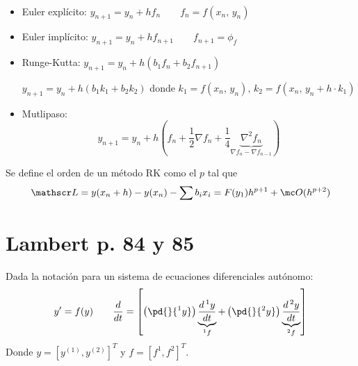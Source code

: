 \begin{ejems} \, 
    \begin{itemize}
        \item Euler expl\'icito: $y_{n+1} = y_n + h f_n \qquad f_n = f(x_n,\, y_n)$
        \item Euler impl\'icito: $y_{n+1} = y_n + h f_{n+1} \qquad f_{n+1} = \phi_f $
        \item Runge-Kutta: $y_{n+1} = y_n + h(b_1 f_n + b_2 f_{n+1}) $
        
        \hspace{1.5cm} $y_{n+1} = y_n + h(b_1 k_1 + b_2 k_2) $ donde $k_1 = f(x_n,\, y_n), \, k_2 = f(x_n,\, y_n+h \cdot k_1)$
        \item Mutlipaso: 
        $$y_{n+1} = y_n + h \left( f_n + \frac{1}{2} \nabla f_n  + \frac{1}{4} \underbrace{\nabla^2 f_n}_{\nabla f_n-\nabla f_{n-1}} \right)$$
    \end{itemize}
\end{ejems}


\begin{defi}
    Se define el orden de un m\'etodo RK como el $p$ tal que
    $$\mathscr L = y(x_n +h) - y(x_n) - \sum b_i x_i = F(y_1) h^{p+1} + \mc O (h^{p+2})$$
\end{defi}


































\section*{Lambert p. 84 y 85}

Dada la notación para un sistema de ecuaciones diferenciales autónomo:
$$ y' = f(y) \qquad \frac{d}{dt} = \left[ \left( \pd{}{^1y}   \right)  \underbrace{\frac{d\, ^1y}{dt}}_{^1f} + \left( \pd{}{^2y}   \right)  \underbrace{\frac{d \, ^2y}{dt}}_{^2f}\right] $$
Donde $y = [y^{(1)}, y^{(2)}]^T$ y $f = [f^1, f^2]^T$.

